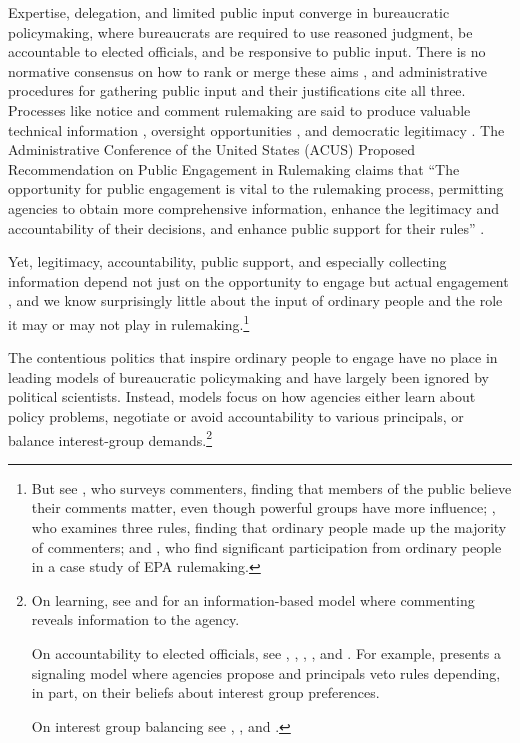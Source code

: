 % 
Expertise, delegation, and limited public input converge in bureaucratic policymaking, where bureaucrats are required to use reasoned judgment, be accountable to elected officials, and be responsive to public input. There is no normative consensus on how to rank or merge these aims \citep{Wilson1967}, and administrative procedures for gathering public input and their justifications cite all three. Processes like notice and comment rulemaking are said to produce valuable technical information \citep{Yackee2006JPART, Nelson2012}, oversight opportunities \citep{Balla1998}, and democratic legitimacy \citep{Croley2003, Rosenbloom2003}. The Administrative Conference of the United States (ACUS) Proposed Recommendation on Public Engagement in Rulemaking claims that ``The opportunity for public engagement is vital to the rulemaking process, permitting agencies to obtain more comprehensive information, enhance the legitimacy and accountability of their decisions, and enhance public support for their rules'' \citep{ACUS2018}. 

Yet, legitimacy, accountability, public support, and especially collecting information depend not just on the opportunity to engage but actual engagement \citep{Herz2018}, and we know surprisingly little about the input of ordinary people and the role it may or may not play in rulemaking.\footnote{ 
But see \citet{Yackee2015JPART}, who surveys commenters, finding that members of the public believe their comments matter, even though powerful groups have more influence; \citet{Cuellar2005}, who examines three rules, finding that ordinary people made up the majority of commenters; and \citet{Balla2018}, who find significant participation from ordinary people in a case study of EPA rulemaking.} 


The contentious politics that inspire ordinary people to engage have no place in leading models of bureaucratic policymaking and have largely been ignored by political scientists.
Instead, models focus on how agencies either learn about policy problems, negotiate or avoid accountability to various principals, or balance interest-group demands.\footnote{
On learning, see \citet{yackee2012} and \citet{Libgober2018} for an information-based model where commenting reveals information to the agency. 

On accountability to elected officials, see  \citet{Furlong1997}, \citet{Nou2016}, \citet{Potter2016}, \citet{Woods2018}, and \citet{Yackee2009RegGov}. For example, \citet{Potter2014dis} presents a signaling model where agencies propose and principals veto rules depending, in part, on their beliefs about interest group preferences. 

On interest group balancing see \citet{Yackee2006JOP},  \citet{Yackee2006JPART}, and \citet{Kerwin2011}.
} 

